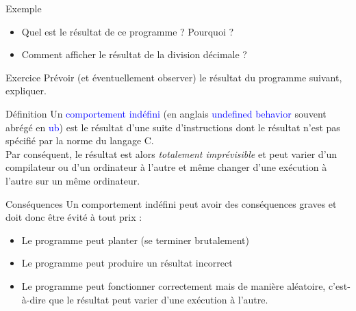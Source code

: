 \documentclass[10pt]{beamer}
\begin{document}
\begin{frame}[fragile]{\Ctitle}{\stitle}
	\begin{exampleblock}{Exemple}
		\begin{itemize}
			\item<2-> Quel est le résultat de ce programme ? Pourquoi ?
			\item<3-> Comment afficher le résultat de la division décimale ?
		\end{itemize}
	\end{exampleblock}
\end{frame}

\begin{frame}[fragile]{\Ctitle}{\stitle}
	\begin{exampleblock}{Exercice}
		Prévoir (et éventuellement observer) le résultat du programme suivant, expliquer.
	\end{exampleblock}
\end{frame}

\begin{frame}{\Ctitle}{\stitle}
	\begin{alertblock}{Définition}
		Un \textcolor{blue}{comportement indéfini} (en anglais \textcolor{blue}{undefined behavior} souvent abrégé en \textcolor{blue}{\sc ub}) est le résultat d'une suite d'instructions dont le résultat n'est pas spécifié par la norme du langage C. \\
		Par conséquent, le résultat est alors \textit{\textcolor{BrickRed}{totalement imprévisible}} et peut varier d'un compilateur ou d'un ordinateur à l'autre et même changer d'une exécution à l'autre sur un même ordinateur.
	\end{alertblock}
	{\begin{block}{Conséquences}
		Un comportement indéfini peut avoir des conséquences graves et doit donc être évité à tout prix :
		\begin{itemize}
			\item Le programme peut planter (se terminer brutalement)
			\item Le programme peut produire un résultat incorrect
			\item Le programme peut fonctionner correctement mais de manière aléatoire, c'est-à-dire que le résultat peut varier d'une exécution à l'autre.
		\end{itemize}
	\end{block}}
\end{frame}
\end{document}
